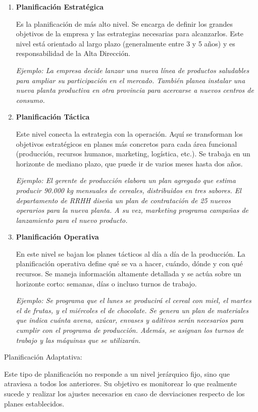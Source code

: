 \documentclass[a4paper,oneside,11pt]{article}
\begin{document}
\begin{enumerate}
    \item \textbf{Planificación Estratégica}

    Es la planificación de más alto nivel. Se encarga de definir los grandes objetivos de la empresa y las estrategias necesarias para alcanzarlos. Este nivel está orientado al largo plazo (generalmente entre 3 y 5 años) y es responsabilidad de la Alta Dirección.

    \textit{Ejemplo: La empresa decide lanzar una nueva línea de productos saludables para ampliar su participación en el mercado. También planea instalar una nueva planta productiva en otra provincia para acercarse a nuevos centros de consumo.}

    \item \textbf{Planificación Táctica}

    Este nivel conecta la estrategia con la operación. Aquí se transforman los objetivos estratégicos en planes más concretos para cada área funcional (producción, recursos humanos, marketing, logística, etc.). Se trabaja en un horizonte de mediano plazo, que puede ir de varios meses hasta dos años.

    \textit{Ejemplo: El gerente de producción elabora un plan agregado que estima producir 90.000 kg mensuales de cereales, distribuidos en tres sabores. El departamento de RRHH diseña un plan de contratación de 25 nuevos operarios para la nueva planta. A su vez, marketing programa campañas de lanzamiento para el nuevo producto.}

    \item \textbf{Planificación Operativa}

    En este nivel se bajan los planes tácticos al día a día de la producción. La planificación operativa define qué se va a hacer, cuándo, dónde y con qué recursos. Se maneja información altamente detallada y se actúa sobre un horizonte corto: semanas, días o incluso turnos de trabajo.

    \textit{Ejemplo: Se programa que el lunes se producirá el cereal con miel, el martes el de frutas, y el miércoles el de chocolate. Se genera un plan de materiales que indica cuánta avena, azúcar, envases y aditivos serán necesarios para cumplir con el programa de producción. Además, se asignan los turnos de trabajo y las máquinas que se utilizarán.}

\end{enumerate}
Planificación Adaptativa:

Este tipo de planificación no responde a un nivel jerárquico fijo, sino que atraviesa a todos los anteriores. Su objetivo es monitorear lo que realmente sucede y realizar los ajustes necesarios en caso de desviaciones respecto de los planes establecidos.
\end{document}
